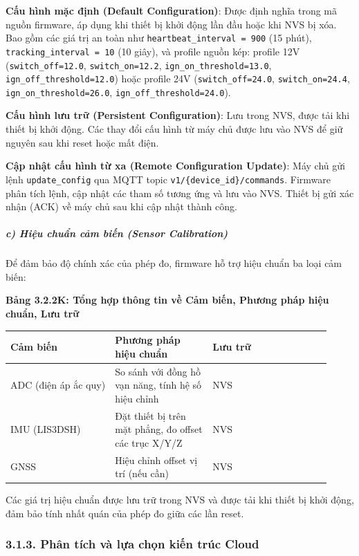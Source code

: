 \documentclass[13pt,a4paper]{extarticle}
\newcounter{none} %
\newcommand{\thesislongtableorignewline}{}
\let\thesislongtableorignewline\\
\renewcommand{\\}{\thesislongtableorignewline\hline}%
\let\\\thesislongtableorignewline
\newcommand{\thesistabletitle}[1]{%
  \begin{center}\textbf{#1}\end{center}%
}
\begin{document}
\textbf{Cấu hình mặc định (Default Configuration)}: Được định nghĩa
trong mã nguồn firmware, áp dụng khi thiết bị khởi động lần đầu hoặc khi
NVS bị xóa. Bao gồm các giá trị an toàn như
\texttt{heartbeat\_interval\ =\ 900} (15 phút),
\texttt{tracking\_interval\ =\ 10} (10 giây), và profile nguồn kép:
profile 12V (\texttt{switch\_off=12.0}, \texttt{switch\_on=12.2},
\texttt{ign\_on\_threshold=13.0}, \texttt{ign\_off\_threshold=12.0})
hoặc profile 24V (\texttt{switch\_off=24.0}, \texttt{switch\_on=24.4},
\texttt{ign\_on\_threshold=26.0}, \texttt{ign\_off\_threshold=24.0}).

\textbf{Cấu hình lưu trữ (Persistent Configuration)}: Lưu trong NVS,
được tải khi thiết bị khởi động. Các thay đổi cấu hình từ máy chủ được
lưu vào NVS để giữ nguyên sau khi reset hoặc mất điện.

\textbf{Cập nhật cấu hình từ xa (Remote Configuration Update)}: Máy chủ
gửi lệnh \texttt{update\_config} qua MQTT topic
\texttt{v1/\{device\_id\}/commands}. Firmware phân tích lệnh, cập nhật
các tham số tương ứng và lưu vào NVS. Thiết bị gửi xác nhận (ACK) về máy
chủ sau khi cập nhật thành công.

\subparagraph{c) Hiệu chuẩn cảm biến (Sensor
Calibration)}\label{c-hiux1ec7u-chuux1ea9n-cux1ea3m-biux1ebfn-sensor-calibration}

Để đảm bảo độ chính xác của phép đo, firmware hỗ trợ hiệu chuẩn ba loại
cảm biến:

{\def\LTcaptype{none} %
\thesistabletitle{Bảng 3.2.2K: Tổng hợp thông tin về Cảm biến, Phương pháp hiệu chuẩn, Lưu trữ}

\begin{longtable}{|p{0.30\linewidth}|p{0.28\linewidth}|p{0.34\linewidth}|}
\hline \textbf{Cảm biến} & \textbf{Phương pháp hiệu chuẩn} & \textbf{Lưu trữ} \\
\hline
\endhead
\hline
\endlastfoot
ADC (điện áp ắc quy) & So sánh với đồng hồ vạn năng, tính hệ số hiệu
chỉnh & NVS \\
IMU (LIS3DSH) & Đặt thiết bị trên mặt phẳng, đo offset các trục X/Y/Z &
NVS \\
GNSS & Hiệu chỉnh offset vị trí (nếu cần) & NVS \\
\end{longtable}
}

Các giá trị hiệu chuẩn được lưu trữ trong NVS và được tải khi thiết bị
khởi động, đảm bảo tính nhất quán của phép đo giữa các lần reset.

\subsubsection{3.1.3. Phân tích và lựa chọn kiến trúc Cloud}
\end{document}
